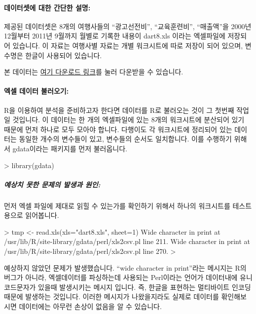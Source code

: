 \paragraph{데이터셋에 대한 간단한 설명:}  
제공된 데이터셋은 8개의 여행사들의 ``광고선전비'', ``교육훈련비'', ``매출액''을 2000년 12월부터 2011년 9월까지 월별로 기록한 내용이 dart8.xls 이라는 엑셀파일에 저장되어 있습니다. 
이 자료는 여행사별 자료는 개별 워크시트에 따로 저장이 되어 있으며, 변수명은 한글이 사용되어 있습니다.

본 데이터는 \href{http://korea.gnu.org/gnustats/dataset/dart8.xls}{여기 다운로드 링크}를 눌러 다운받을 수 있습니다.

\paragraph{엑셀 데이터 불러오기:}  
R을 이용하여 분석을 준비하고자 한다면 데이터를 R로 불러오는 것이 그 첫번째 작업일 것입니다.
이 데이터는 한 개의 엑셀파일에 있는 8개의 워크시트에 분산되어 있기 때문에 먼저 하나로 모두 모아야 합니다.
다행이도 각 워크시트에 정리되어 있는 데이터는 동일한 개수의 변수들이 있고, 변수들의 순서도 일치합니다.
이를 수행하기 위해서 gdata이라는 패키지를 먼저 불러옵니다.

\begin{Schunk}
\begin{Soutput}
> library(gdata)
\end{Soutput}
\end{Schunk}

\subparagraph{예상치 못한 문제의 발생과 원인:} 
먼저 엑셀 파일에 제대로 읽힐 수 있는가를 확인하기 위해서 하나의 워크시트를 테스트용으로 읽어봅니다.

\begin{Schunk}
\begin{Soutput}
> tmp <- read.xls(xls="dart8.xls", sheet=1)
Wide character in print at /usr/lib/R/site-library/gdata/perl/xls2csv.pl line 211.
Wide character in print at /usr/lib/R/site-library/gdata/perl/xls2csv.pl line 270.
> 
\end{Soutput}
\end{Schunk}

예상하지 않았던 문제가 발생했습니다. 
``wide character in print''라는 메시지는 R의 버그가 아니라, 엑셀데이터를 파싱하는데 사용되는 Perl이라는  언어가 데이터내에 유니코드문자가 있을때 발생시키는 메시지 입니다.
즉, 한글을 표현하는 멀티바이트 인코딩 때문에 발생하는 것입니다.
이러한 메시지가 나왔을지라도 실제로 데이터를 홖인해보시면 데이터에는 아무런 손상이 없음을 알 수 있습니다.

